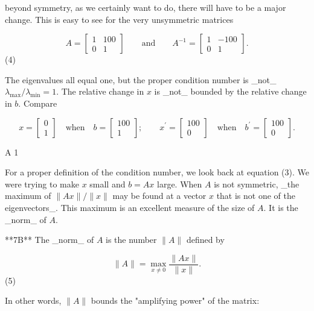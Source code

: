 beyond symmetry, as we certainly want to do, there will have to be a major change. This is easy to see for the very unsymmetric matrices

\[A=\begin{bmatrix}1&100\\ 0&1\end{bmatrix}\qquad\text{and}\qquad A^{-1}=\begin{bmatrix}1&-100\\ 0&1\end{bmatrix}.\] (4)

The eigenvalues all equal one, but the proper condition number is _not_\(\lambda_{\max}/\lambda_{\min}=1\). The relative change in \(x\) is _not_ bounded by the relative change in \(b\). Compare

\[x=\begin{bmatrix}0\\ 1\end{bmatrix}\quad\text{when}\quad b=\begin{bmatrix}100\\ 1\end{bmatrix};\qquad x^{\prime}=\begin{bmatrix}100\\ 0\end{bmatrix}\quad\text{when}\quad b^{\prime}=\begin{bmatrix}100\\ 0\end{bmatrix}.\]

A 1%

For a proper definition of the condition number, we look back at equation (3). We were trying to make \(x\) small and \(b=Ax\) large. When \(A\) is not symmetric, _the maximum of \(\|Ax\|/\|x\|\) may be found at a vector \(x\) that is not one of the eigenvectors_. This maximum is an excellent measure of the size of \(A\). It is the _norm_ of \(A\).

**7B** The _norm_ of \(A\) is the number \(\|A\|\) defined by

\[\|A\|=\max_{x\neq 0}\frac{\|Ax\|}{\|x\|}.\] (5)

In other words, \(\|A\|\) bounds the "amplifying power" of the matrix:

